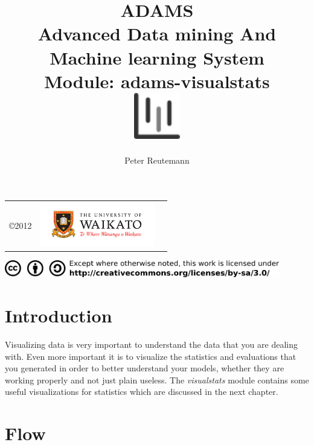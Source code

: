 \documentclass[a4paper]{book}
\title{
  \textbf{ADAMS} \\
  {\Large \textbf{A}dvanced \textbf{D}ata mining \textbf{A}nd \textbf{M}achine
  learning \textbf{S}ystem} \\
  {\Large Module: adams-visualstats} \\
  \vspace{1cm}
  \includegraphics[width=2cm]{images/visualstats-module.png} \\
}
\author{
  Peter Reutemann
}
\begin{document}
\begin{titlepage}
\maketitle

\thispagestyle{empty}
\center
\begin{table}[b]
	\begin{tabular}{c l l}
		\parbox[c][2cm]{2cm}{\copyright 2012} &
		\parbox[c][2cm]{5cm}{\includegraphics[width=5cm]{images/coat_of_arms.pdf}} \\
	\end{tabular}
	\includegraphics[width=12cm]{images/cc.png} \\
\end{table}

\end{titlepage}

\tableofcontents
\listoffigures

\chapter{Introduction}
Visualizing data is very important to understand the data that you are dealing
with. Even more important it is to visualize the statistics and evaluations 
that you generated in order to better understand your models, whether they are
working properly and not just plain useless. The \textit{visualstats} module
contains some useful visualizations for statistics which are discussed in the 
next chapter.

\chapter{Flow}
\end{document}
